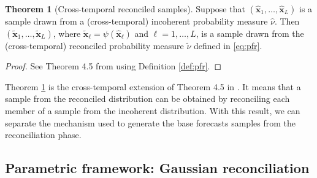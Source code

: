 \documentclass[a4paper,11pt]{article}
\newcommand{\xvet}{\bm{x}}
\theoremstyle{definition}
\newtheorem{theorem}{Theorem}[section]
\begin{document}
\begin{theorem}[Cross-temporal reconciled samples] \label{thm:rs}
	Suppose that $(\widehat{\xvet}_1, \dots, \widehat{\xvet}_L)$ is a sample drawn from a (cross-temporal) incoherent probability measure $\widehat{\nu}$. Then $(\widetilde{\xvet}_1, \dots, \widetilde{\xvet}_L)$, where $\widetilde{\xvet}_\ell=\psi(\widehat{\xvet}_\ell)$ and $\ell= 1, \dots, L$, is a sample drawn from the (cross-temporal) reconciled probability measure $\widetilde{\nu}$ defined in \eqref{eq:pfr}.
\end{theorem}
\begin{proof}
	See Theorem 4.5 from \cite{panagiotelis2023} using Definition \ref{def:pfr}.
\end{proof}
Theorem \ref{thm:rs} is the cross-temporal extension of Theorem 4.5 in \cite{panagiotelis2023}. It means that a sample from the reconciled distribution can be obtained by reconciling each member of a sample from the incoherent distribution. With this result, we can separate the mechanism used to generate the base forecasts samples from the reconciliation phase.


\subsection{Parametric framework: Gaussian reconciliation}\label{ssec:prob_pf}
\end{document}

